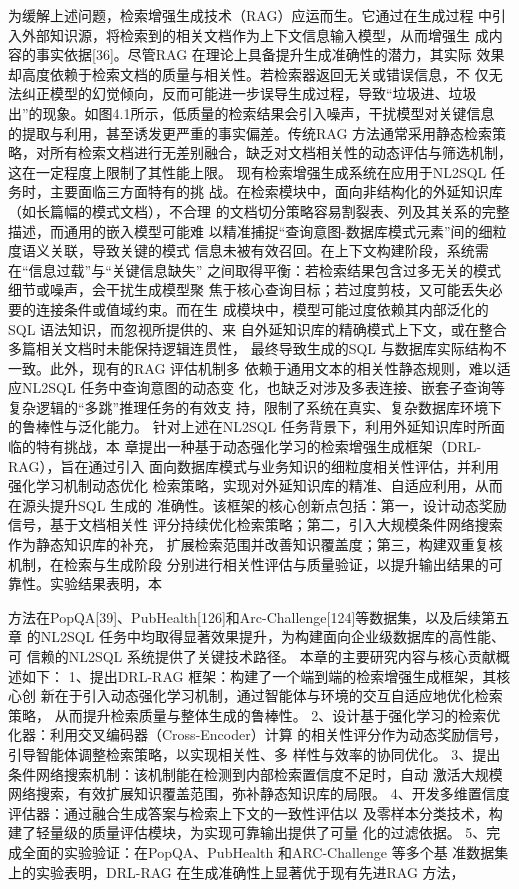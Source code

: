 \documentclass[12pt,a4paper,openright,UTF8]{ctexbook}
\begin{document}
为缓解上述问题，检索增强生成技术（RAG）应运而生。它通过在生成过程 中引入外部知识源，将检索到的相关文档作为上下文信息输入模型，从而增强生 成内容的事实依据[36]。尽管RAG 在理论上具备提升生成准确性的潜力，其实际 效果却高度依赖于检索文档的质量与相关性。若检索器返回无关或错误信息，不 仅无法纠正模型的幻觉倾向，反而可能进一步误导生成过程，导致“垃圾进、垃圾 出”的现象。如图4.1所示，低质量的检索结果会引入噪声，干扰模型对关键信息 的提取与利用，甚至诱发更严重的事实偏差。传统RAG 方法通常采用静态检索策 略，对所有检索文档进行无差别融合，缺乏对文档相关性的动态评估与筛选机制， 这在一定程度上限制了其性能上限。 现有检索增强生成系统在应用于NL2SQL 任务时，主要面临三方面特有的挑 战。在检索模块中，面向非结构化的外延知识库（如长篇幅的模式文档），不合理 的文档切分策略容易割裂表、列及其关系的完整描述，而通用的嵌入模型可能难 以精准捕捉“查询意图-数据库模式元素”间的细粒度语义关联，导致关键的模式 信息未被有效召回。在上下文构建阶段，系统需在“信息过载”与“关键信息缺失” 之间取得平衡：若检索结果包含过多无关的模式细节或噪声，会干扰生成模型聚 焦于核心查询目标；若过度剪枝，又可能丢失必要的连接条件或值域约束。而在生 成模块中，模型可能过度依赖其内部泛化的SQL 语法知识，而忽视所提供的、来 自外延知识库的精确模式上下文，或在整合多篇相关文档时未能保持逻辑连贯性， 最终导致生成的SQL 与数据库实际结构不一致。此外，现有的RAG 评估机制多 依赖于通用文本的相关性静态规则，难以适应NL2SQL 任务中查询意图的动态变 化，也缺乏对涉及多表连接、嵌套子查询等复杂逻辑的“多跳”推理任务的有效支 持，限制了系统在真实、复杂数据库环境下的鲁棒性与泛化能力。 针对上述在NL2SQL 任务背景下，利用外延知识库时所面临的特有挑战，本 章提出一种基于动态强化学习的检索增强生成框架（DRL-RAG），旨在通过引入 面向数据库模式与业务知识的细粒度相关性评估，并利用强化学习机制动态优化 检索策略，实现对外延知识库的精准、自适应利用，从而在源头提升SQL 生成的 准确性。该框架的核心创新点包括：第一，设计动态奖励信号，基于文档相关性 评分持续优化检索策略；第二，引入大规模条件网络搜索作为静态知识库的补充， 扩展检索范围并改善知识覆盖度；第三，构建双重复核机制，在检索与生成阶段 分别进行相关性评估与质量验证，以提升输出结果的可靠性。实验结果表明，本

方法在PopQA[39]、PubHealth[126]和Arc-Challenge[124]等数据集，以及后续第五章 的NL2SQL 任务中均取得显著效果提升，为构建面向企业级数据库的高性能、可 信赖的NL2SQL 系统提供了关键技术路径。 本章的主要研究内容与核心贡献概述如下： 1、提出DRL-RAG 框架：构建了一个端到端的检索增强生成框架，其核心创 新在于引入动态强化学习机制，通过智能体与环境的交互自适应地优化检索策略， 从而提升检索质量与整体生成的鲁棒性。 2、设计基于强化学习的检索优化器：利用交叉编码器（Cross-Encoder）计算 的相关性评分作为动态奖励信号，引导智能体调整检索策略，以实现相关性、多 样性与效率的协同优化。 3、提出条件网络搜索机制：该机制能在检测到内部检索置信度不足时，自动 激活大规模网络搜索，有效扩展知识覆盖范围，弥补静态知识库的局限。 4、开发多维置信度评估器：通过融合生成答案与检索上下文的一致性评估以 及零样本分类技术，构建了轻量级的质量评估模块，为实现可靠输出提供了可量 化的过滤依据。 5、完成全面的实验验证：在PopQA、PubHealth 和ARC-Challenge 等多个基 准数据集上的实验表明，DRL-RAG 在生成准确性上显著优于现有先进RAG 方法，
\end{document}
